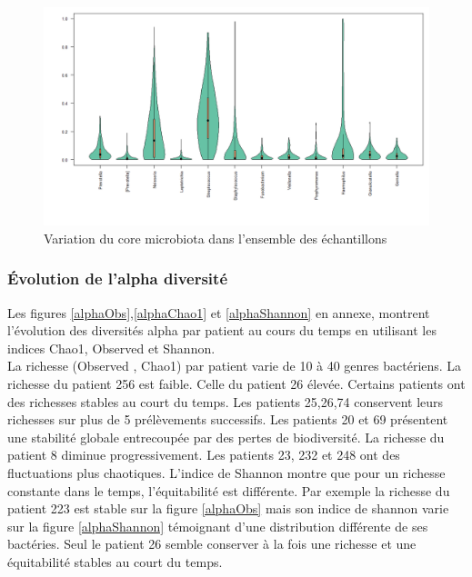 \documentclass[12pt,a4paper]{article}
\begin{document}
\begin{figure}[t]
\begin{center}
\includegraphics[scale=0.5]{img/variability.png}\hfill
\end{center}
\caption{Variation du core microbiota dans l'ensemble des échantillons}
\label{violon}
\end{figure}

\subsubsection{Évolution de l'alpha diversité}
Les figures \ref{alphaObs},\ref{alphaChao1} et \ref{alphaShannon} en annexe, montrent l’évolution des diversités alpha par patient au cours du temps en utilisant les indices Chao1, Observed et Shannon. \\
La richesse (Observed , Chao1) par patient varie de 10 à 40 genres bactériens. La richesse du patient 256 est faible. Celle du patient 26 élevée.
Certains patients ont des richesses stables au court du temps. Les patients 25,26,74 conservent leurs richesses sur plus de 5 prélèvements successifs. Les patients 20 et 69 présentent une stabilité globale entrecoupée par des pertes de biodiversité. La richesse du patient 8 diminue progressivement. Les patients 23, 232 et 248 ont des fluctuations plus chaotiques.
L'indice de Shannon montre que pour un richesse constante dans le temps, l'équitabilité est différente. Par exemple la richesse du patient 223 est stable sur la figure \ref{alphaObs} mais son indice de shannon varie sur la figure \ref{alphaShannon} témoignant d'une distribution différente de ses bactéries. Seul le patient 26 semble conserver à la fois une richesse et une équitabilité stables au court du temps.
\end{document}
